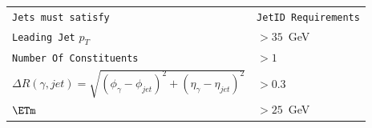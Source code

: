 \documentclass{beamer}
\begin{document}
\begin{frame}
\begin{minipage}[b]{0.45\linewidth}
{\begin{tabular}[2cm]{l l}
  \hline 
  \hline
 \texttt{Jets must satisfy} & \texttt{JetID Requirements} \\
 \texttt{Leading Jet} $p_{T}$ & $ > 35$~GeV \\
 \texttt{Number Of Constituents} & $ > 1$ \\
 $\Delta R(\gamma, jet) = \sqrt{(\phi_{\gamma}-\phi_{jet})^{2} + (\eta_{\gamma}-\eta_{jet})^{2}}$ & $ > 0.3$ \\
\hline \hline
 $\ETm$&  $> 25$~GeV \\
 \hline
\end{tabular}
}
  \end{minipage}
\end{frame}
\end{document}
